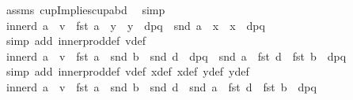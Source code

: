 \begin{isabellebody}
\ assms\ cup{}Impliescup{}abd\ \isamarkupfalse%
\ simp\isanewline
\ \ \isamarkupfalse%
\ inner{\isacharunderscore}{\kern0pt}d{}{\isacharcolon}{\kern0pt}\ {\isachardoublequoteopen}a\ {\isasymbullet}\ v\ {\isacharequal}{\kern0pt}\ {\isacharparenleft}{\kern0pt}fst\ a\ {\isacharasterisk}{\kern0pt}\ {\isacharparenleft}{\kern0pt}{\isacharparenleft}{\kern0pt}y{}\ {\isacharminus}{\kern0pt}\ y{}{\isacharparenright}{\kern0pt}\ {\isacharslash}{\kern0pt}\ dpq{\isacharparenright}{\kern0pt}{\isacharparenright}{\kern0pt}\ {\isacharplus}{\kern0pt}\ {\isacharparenleft}{\kern0pt}snd\ a\ {\isacharasterisk}{\kern0pt}\ {\isacharparenleft}{\kern0pt}x{}\ {\isacharminus}{\kern0pt}\ x{}{\isacharparenright}{\kern0pt}\ {\isacharslash}{\kern0pt}\ dpq{\isacharparenright}{\kern0pt}{\isachardoublequoteclose}\isanewline
\ \ \ \ \ \ \isamarkupfalse%
\ {\isacharparenleft}{\kern0pt}simp\ add{\isacharcolon}{\kern0pt}\ inner{\isacharunderscore}{\kern0pt}prod{\isacharunderscore}{\kern0pt}def\ v{\isacharunderscore}{\kern0pt}def{\isacharparenright}{\kern0pt}\isanewline
\ \ \isamarkupfalse%
\ inner{\isacharunderscore}{\kern0pt}d{}{\isacharcolon}{\kern0pt}\ {\isachardoublequoteopen}a\ {\isasymbullet}\ v\ {\isacharequal}{\kern0pt}\ {\isacharparenleft}{\kern0pt}fst\ a\ {\isacharasterisk}{\kern0pt}\ {\isacharparenleft}{\kern0pt}{\isacharparenleft}{\kern0pt}snd\ b\ {\isacharminus}{\kern0pt}\ snd\ d{\isacharparenright}{\kern0pt}\ {\isacharslash}{\kern0pt}\ dpq{\isacharparenright}{\kern0pt}{\isacharparenright}{\kern0pt}\ {\isacharplus}{\kern0pt}\ {\isacharparenleft}{\kern0pt}snd\ a\ {\isacharasterisk}{\kern0pt}\ {\isacharparenleft}{\kern0pt}fst\ d\ {\isacharminus}{\kern0pt}\ fst\ b{\isacharparenright}{\kern0pt}\ {\isacharslash}{\kern0pt}\ dpq{\isacharparenright}{\kern0pt}{\isachardoublequoteclose}\isanewline
\ \ \ \ \isamarkupfalse%
\ {\isacharparenleft}{\kern0pt}simp\ add{\isacharcolon}{\kern0pt}\ inner{\isacharunderscore}{\kern0pt}prod{\isacharunderscore}{\kern0pt}def\ v{\isacharunderscore}{\kern0pt}def\ x{}{\isacharunderscore}{\kern0pt}def\ x{}{\isacharunderscore}{\kern0pt}def\ y{}{\isacharunderscore}{\kern0pt}def\ y{}{\isacharunderscore}{\kern0pt}def{\isacharparenright}{\kern0pt}\isanewline
\ \ \isamarkupfalse%
\ inner{\isacharunderscore}{\kern0pt}d{}{\isacharcolon}{\kern0pt}\ {\isachardoublequoteopen}a\ {\isasymbullet}\ v\ {\isacharequal}{\kern0pt}\ {\isacharparenleft}{\kern0pt}fst\ a\ {\isacharasterisk}{\kern0pt}\ {\isacharparenleft}{\kern0pt}snd\ b\ {\isacharminus}{\kern0pt}\ snd\ d{\isacharparenright}{\kern0pt}\ {\isacharplus}{\kern0pt}\ snd\ a\ {\isacharasterisk}{\kern0pt}\ {\isacharparenleft}{\kern0pt}fst\ d\ {\isacharminus}{\kern0pt}\ fst\ b{\isacharparenright}{\kern0pt}{\isacharparenright}{\kern0pt}\ {\isacharslash}{\kern0pt}\ dpq{\isachardoublequoteclose}\isanewline

\end{isabellebody}
